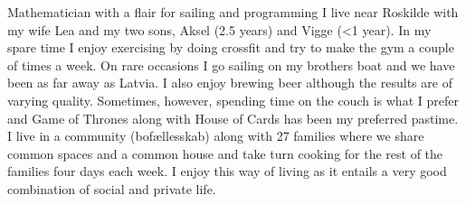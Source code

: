 



%
% 


% 

\begin{cventries}

\cventry
{} %
{Mathematician with a flair for sailing and programming} %
{}%
{} %
{ %
I live near Roskilde with my wife Lea and my two sons, Aksel (2.5 years) and Vigge (<1 year). In my spare time I enjoy exercising by doing crossfit and try to make the gym a couple of times a week. On rare occasions I go sailing on my brothers boat and we have been as far away as Latvia. I also enjoy brewing beer although the results are of varying quality. Sometimes, however, spending time on the couch is what I prefer and Game of Thrones along with House of Cards has been my preferred pastime. I live in a community (bofællesskab) along with 27 families where we share common spaces and a common house and take turn cooking for the rest of the families four days each week. I enjoy this way of living as it entails a very good combination of social and private life.
}






\end{cventries}
